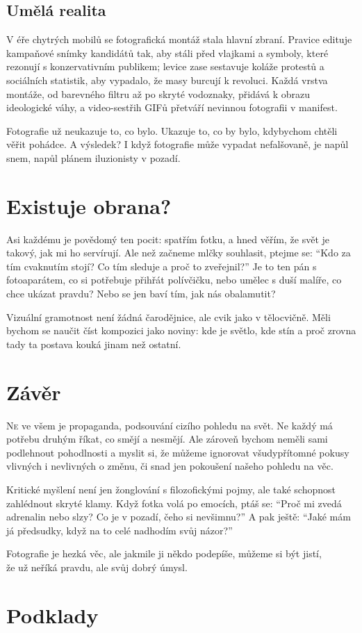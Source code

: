 \documentclass[12pt]{article}
\begin{document}
\subsection{Umělá realita}
V éře chytrých mobilů se fotografická montáž stala hlavní zbraní. Pravice edituje kampaňové snímky kandidátů tak, 
aby stáli před vlajkami a symboly, které rezonují s konzervativním publikem; levice zase sestavuje koláže protestů 
a sociálních statistik, aby vypadalo, že masy burcují k revoluci. Každá vrstva montáže, od barevného filtru až po 
skryté vodoznaky, přidává k obrazu ideologické váhy, a video-sestřih GIFů přetváří nevinnou fotografii v manifest.

Fotografie už neukazuje to, co bylo. Ukazuje to, co by bylo, kdybychom chtěli věřit pohádce.
A výsledek? I když fotografie může vypadat nefalšovaně, je napůl snem, napůl plánem iluzionisty v pozadí.

\section{Existuje obrana?}
Asi každému je povědomý ten pocit: spatřím fotku, a hned věřím, že svět je takový, jak mi ho servírují. Ale než začneme 
mlčky souhlasit, ptejme se: \enquote{Kdo za tím cvaknutím stojí? Co tím sleduje a proč to zveřejnil?} Je to ten pán s 
fotoaparátem, co si potřebuje přihřát polívčičku, nebo umělec s duší malíře, co chce ukázat pravdu? Nebo se jen baví 
tím, jak nás obalamutit?

Vizuální gramotnost není žádná čarodějnice, ale cvik jako v tělocvičně. Měli bychom se naučit číst kompozici jako 
noviny: kde je světlo, kde stín a proč zrovna tady ta postava kouká jinam než ostatní.

\section{Závěr}
\lettrine[lines=3, findent=5pt, nindent=0pt]{N}{e} ve všem je propaganda, podsouvání cizího pohledu na svět. Ne každý má 
potřebu druhým říkat, co smějí a nesmějí. Ale zároveň bychom neměli sami podlehnout pohodlnosti a myslit si, že můžeme 
ignorovat všudypřítomné pokusy vlivných i nevlivných o změnu, či snad jen pokoušení našeho pohledu na věc.

Kritické myšlení není jen žonglování s filozofickými pojmy, ale také schopnost zahlédnout skryté klamy. Když fotka volá 
po emocích, ptáš se: \enquote{Proč mi zvedá adrenalin nebo slzy? Co je v pozadí, čeho si nevšimnu?} A pak ještě: 
\enquote{Jaké mám já předsudky, když na to celé nadhodím svůj názor?}

\vspace{6em}

\begin{center}
    Fotografie je hezká věc, ale jakmile ji někdo podepíše, můžeme si být jistí, \\
    že už neříká pravdu, ale svůj dobrý úmysl.
\end{center}

\newpage
\section{Podklady}
\nocite{*}
\printbibliography[heading=none,title={}]
\end{document}
